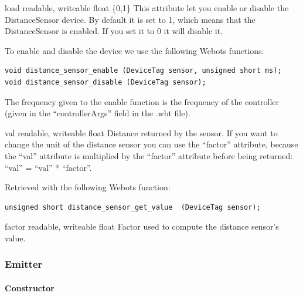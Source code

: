 \begin{itemize}
\begin{attribute}{load}
  {readable, writeable}
  {float}
  {\{0,1\}}
  This attribute let you enable or disable the
  DistanceSensor device.  By default it is set to 1, which means that
  the DistanceSensor is enabled. If you set it to 0 it will disable
  it.


  To enable and disable the device we use the following Webots
  functions:


\begin{lstlisting}
void distance_sensor_enable (DeviceTag sensor, unsigned short ms);
void distance_sensor_disable (DeviceTag sensor);
\end{lstlisting}

The frequency given to the enable function is the frequency of the
\urbi controller (given in the ``controllerArgs'' field in the .wbt
file).
\end{attribute}

\begin{attribute}{val}
  {readable, writeable}
  {float}
  {}
  Distance returned by the sensor. If you want to change
 the unit of the distance sensor you can use the ``factor'' attribute,
 because the ``val'' attribute is multiplied by the ``factor'' attribute
 before being returned: ``val'' = ``val'' * ``factor''.

 Retrieved with the following Webots function:

\begin{lstlisting}
unsigned short distance_sensor_get_value  (DeviceTag sensor);
\end{lstlisting}
\end{attribute}

\begin{attribute}{factor}
  {readable, writeable}
  {float}
  {}
  Factor used to compute the distance sensor's value.
\end{attribute}
\end{itemize}

\subsubsection{Emitter}
\label{webots.uobjects.robotdevices.emitter}%

\paragraph{Constructor}
\label{webots.uobjects.robotdevices.emitter.constructor}%

